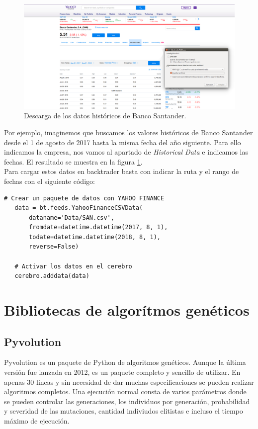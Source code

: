 \documentclass[12pt,a4paper]{article}
\begin{document}
		\begin{figure}[H]
			\centering
			\includegraphics[scale=1]{imagenes/yahoo_finance.png}
			\caption{Descarga de los datos hist\'oricos de Banco Santander.}
			\label{fig:yahoo_finance}
		\end{figure}
				
		Por ejemplo, imaginemos que buscamos los valores hist\'oricos de Banco Santander desde el 1 de agosto de 2017 hasta la misma fecha del a\~{n}o siguiente. Para ello indicamos la empresa, nos vamos al apartado de \textit{Historical Data} e indicamos las fechas. El resultado se muestra en la figura \ref{fig:yahoo_finance}.\\
		
		Para cargar estos datos en backtrader basta con indicar la ruta y el rango de fechas con el siguiente c\'odigo:

		\begin{lstlisting}[basicstyle=\tiny]
   # Crear un paquete de datos con YAHOO FINANCE
   data = bt.feeds.YahooFinanceCSVData(
	   dataname='Data/SAN.csv',
	   fromdate=datetime.datetime(2017, 8, 1),
	   todate=datetime.datetime(2018, 8, 1),
	   reverse=False)
   
   # Activar los datos en el cerebro
   cerebro.adddata(data)
		\end{lstlisting}		
		
	\newpage	
	\section{Bibliotecas de algor\'itmos gen\'eticos}
	
		\subsection{Pyvolution}
		
		Pyvolution es un paquete de Python de algoritmos gen\'eticos. Aunque la \'ultima versi\'on fue lanzada en 2012, es un paquete completo y sencillo de utilizar. En apenas 30 lineas y sin necesidad de dar muchas especificaciones se pueden realizar algoritmos completos. Una ejecuci\'on normal consta de varios par\'ametros donde se pueden controlar las generaciones, los individuos por generaci\'on, probabilidad y severidad de las mutaciones, cantidad indiviudos elitistas e incluso el tiempo m\'aximo de ejecuci\'on.\\
		
\end{document}
